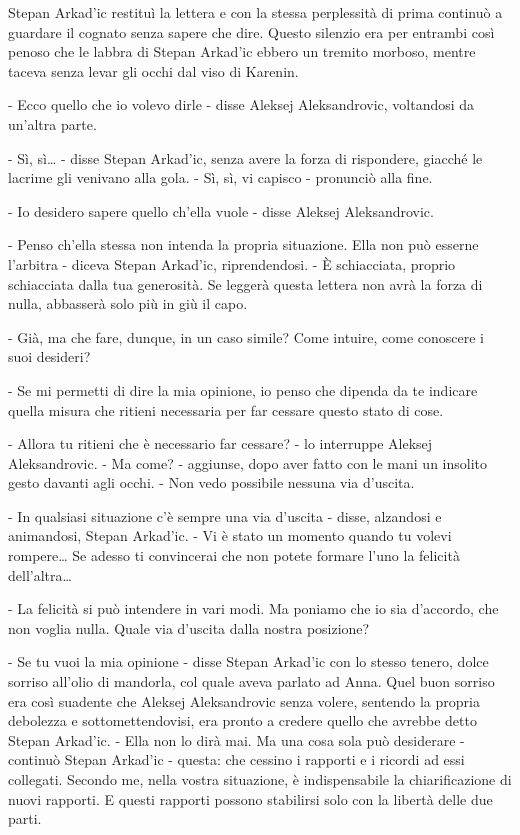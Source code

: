 Stepan Arkad'ic restituì la lettera e con la stessa perplessità di prima continuò a guardare il cognato senza sapere che dire. Questo silenzio era per entrambi così penoso che le labbra di Stepan Arkad'ic ebbero un tremito morboso, mentre taceva senza levar gli occhi dal viso di Karenin. 

- Ecco quello che io volevo dirle - disse Aleksej Aleksandrovic, voltandosi da un'altra parte. 

- Sì, sì\ldots{} - disse Stepan Arkad'ic, senza avere la forza di rispondere, giacché le lacrime gli venivano alla gola. - Sì, sì, vi capisco - pronunciò alla fine. 

- Io desidero sapere quello ch'ella vuole - disse Aleksej Aleksandrovic. 

- Penso ch'ella stessa non intenda la propria situazione. Ella non può esserne l'arbitra - diceva Stepan Arkad'ic, riprendendosi. - È schiacciata, proprio schiacciata dalla tua generosità. Se leggerà questa lettera non avrà la forza di nulla, abbasserà solo più in giù il capo. 

- Già, ma che fare, dunque, in un caso simile? Come intuire, come conoscere i suoi desideri? 

- Se mi permetti di dire la mia opinione, io penso che dipenda da te indicare quella misura che ritieni necessaria per far cessare questo stato di cose. 

- Allora tu ritieni che è necessario far cessare? - lo interruppe Aleksej Aleksandrovic. - Ma come? - aggiunse, dopo aver fatto con le mani un insolito gesto davanti agli occhi. - Non vedo possibile nessuna via d'uscita. 

- In qualsiasi situazione c'è sempre una via d'uscita - disse, alzandosi e animandosi, Stepan Arkad'ic. - Vi è stato un momento quando tu volevi rompere\ldots{} Se adesso ti convincerai che non potete formare l'uno la felicità dell'altra\ldots{} 

- La felicità si può intendere in vari modi. Ma poniamo che io sia d'accordo, che non voglia nulla. Quale via d'uscita dalla nostra posizione? 

- Se tu vuoi la mia opinione - disse Stepan Arkad'ic con lo stesso tenero, dolce sorriso all'olio di mandorla, col quale aveva parlato ad Anna. Quel buon sorriso era così suadente che Aleksej Aleksandrovic senza volere, sentendo la propria debolezza e sottomettendovisi, era pronto a credere quello che avrebbe detto Stepan Arkad'ic. - Ella non lo dirà mai. Ma una cosa sola può desiderare - continuò Stepan Arkad'ic - questa: che cessino i rapporti e i ricordi ad essi collegati. Secondo me, nella vostra situazione, è indispensabile la chiarificazione di nuovi rapporti. E questi rapporti possono stabilirsi solo con la libertà delle due parti. 

